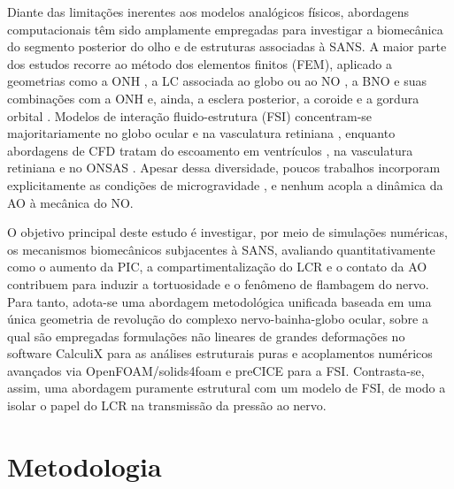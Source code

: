 \documentclass[article, hidelinks,oneside,12pt]{abntex2}
\begin{document}
Diante das limitações inerentes aos modelos analógicos físicos, abordagens computacionais têm sido amplamente empregadas para investigar a biomecânica do segmento posterior do olho e de estruturas associadas à SANS. A maior parte dos estudos recorre ao método dos elementos finitos (FEM), aplicado a geometrias como a ONH \cite{sigal2004, wang2016}, a LC associada ao globo ou ao NO \cite{newson2006, feola2016, sala2023}, a BNO e suas combinações com a ONH \cite{lee2020, islam2024, jafari2025} e, ainda, a esclera posterior, a coroide e a gordura orbital \cite{feola2018, lim2024, reilly2023}. Modelos de interação fluido-estrutura (FSI) concentram-se majoritariamente no globo ocular \cite{furlani, karampelas, maklad} e na vasculatura retiniana \cite{rebhan2019}, enquanto abordagens de CFD tratam do escoamento em ventrículos \cite{holmlund2019}, na vasculatura retiniana \cite{caddy2024} e no ONSAS \cite{namaghi2026}. Apesar dessa diversidade, poucos trabalhos incorporam explicitamente as condições de microgravidade \cite{feola2016, feola2018, lee2020, reilly2023, caddy2024}, e nenhum acopla a dinâmica da AO à mecânica do NO.

O objetivo principal deste estudo é investigar, por meio de simulações numéricas, os mecanismos biomecânicos subjacentes à SANS, avaliando quantitativamente como o aumento da PIC, a compartimentalização do LCR e o contato da AO contribuem para induzir a tortuosidade e o fenômeno de flambagem do nervo. Para tanto, adota-se uma abordagem metodológica unificada baseada em uma única geometria de revolução do complexo nervo-bainha-globo ocular, sobre a qual são empregadas formulações não lineares de grandes deformações no software CalculiX para as análises estruturais puras e acoplamentos numéricos avançados via OpenFOAM/solids4foam e preCICE para a FSI. Contrasta-se, assim, uma abordagem puramente estrutural com um modelo de FSI, de modo a isolar o papel do LCR na transmissão da pressão ao nervo.




\section*{Metodologia}
\end{document}
